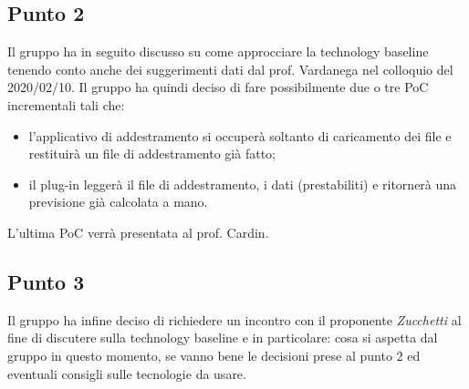     \subsection{Punto 2}
        Il gruppo ha in seguito discusso su come approcciare la technology baseline tenendo conto anche dei suggerimenti dati dal prof. Vardanega nel colloquio del 2020/02/10. Il gruppo ha quindi deciso di fare possibilmente due o tre PoC incrementali tali che:
        \begin{itemize}
        	\item l’applicativo di addestramento si occuperà soltanto di caricamento dei file e restituirà un file di addestramento già fatto;
        	\item il plug-in leggerà il file di addestramento, i dati (prestabiliti) e ritornerà una previsione già calcolata a mano.
        \end{itemize}
    	L'ultima PoC verrà presentata al prof. Cardin.
       
     \subsection{Punto 3}
       Il gruppo ha infine deciso di richiedere un incontro con il proponente \textit{Zucchetti} al fine di discutere sulla technology baseline e in particolare: cosa si aspetta dal gruppo in questo momento, se vanno bene le decisioni prese al punto 2 ed eventuali consigli sulle tecnologie da usare.